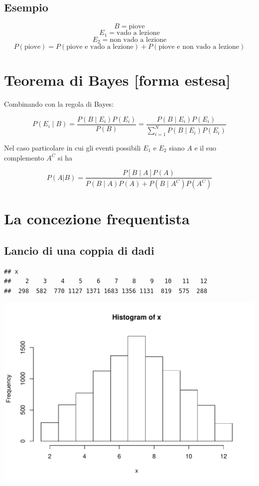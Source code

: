 \documentclass[onecolumn,12pt]{book}\usepackage[]{graphicx}\usepackage[]{color}
\makeatletter
\def\maxwidth{ %
  \ifdim\Gin@nat@width>\linewidth
    \linewidth
  \else
    \Gin@nat@width
  \fi
}
\newenvironment{kframe}{%
 \def\at@end@of@kframe{}%
 \ifinner\ifhmode%
  \def\at@end@of@kframe{\end{minipage}}%
  \begin{minipage}{\columnwidth}%
 \fi\fi%
 \def\FrameCommand##1{\hskip\@totalleftmargin \hskip-\fboxsep
 \colorbox{shadecolor}{##1}\hskip-\fboxsep
     \hskip-\linewidth \hskip-\@totalleftmargin \hskip\columnwidth}%
 \MakeFramed {\advance\hsize-\width
   \@totalleftmargin\z@ \linewidth\hsize
   \@setminipage}}%
 {\par\unskip\endMakeFramed%
 \at@end@of@kframe}
\newenvironment{knitrout}{}{} %
\makeatother
\begin{document}
\subsection{Esempio}

$$B=\textrm{piove}$$
$$E_1 = \textrm{vado a lezione}$$
$$E_2 = \textrm{non vado a lezione}$$
$$P(\textrm{piove}) = P(\textrm{piove e vado a lezione}) + P(\textrm{piove e non vado a lezione}) $$ 

 

\section{Teorema di Bayes [forma estesa]}

Combinando con la regola di Bayes:

$$P (E_i\mid B) = \dfrac{P(B\mid E_i) P(E_i)}{P(B)}= \dfrac{P(B\mid E_i ) P(E_i) }{ 
\sum_{i=1}^N P(B\mid E_i)P(E_i)}$$

Nel caso particolare in cui gli eventi possibili 
$E_1$ e $E_2$ siano $A$ e il suo complemento  $A^C$ si ha

$$P (A|B)=  \dfrac{P[B\mid A] P(A)}{P (B\mid A) P(A)+P(B\mid  A^C) P( A^C)}$$


 
 


\section{La concezione frequentista}
 

\subsection{Lancio di una coppia di dadi}

\begin{knitrout}
\color{fgcolor}\begin{kframe}
\begin{verbatim}
## x
##    2    3    4    5    6    7    8    9   10   11   12 
##  298  582  770 1127 1371 1683 1356 1131  819  575  288
\end{verbatim}
\end{kframe}
\includegraphics[width=\maxwidth]{figure/unnamed-chunk-14-1} 

\end{knitrout}
\end{document}
